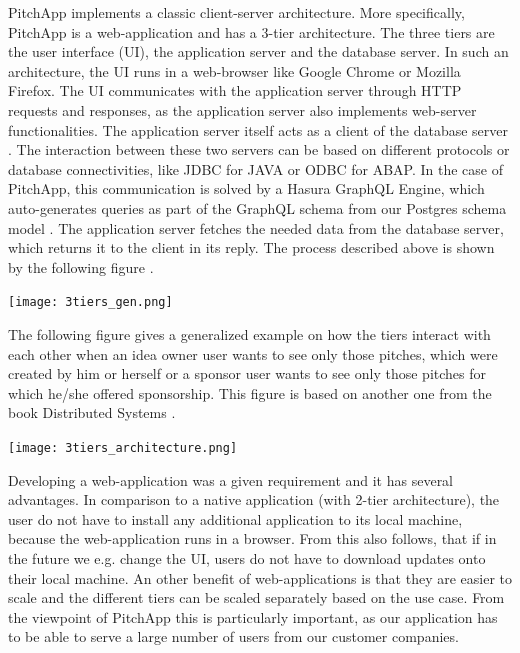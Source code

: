 PitchApp implements a classic client-server architecture. More specifically, PitchApp is a web-application and has a 3-tier architecture. The three tiers are the user interface (UI), the application server and the database server. In such an architecture, the UI runs in a web-browser like Google Chrome or Mozilla Firefox. The UI communicates with the application server through HTTP requests and responses, as the application server also implements web-server functionalities. The application server itself acts as a client of the database server \parencite[p.~80]{MT17}. The interaction between these two servers can be based on different protocols or database connectivities, like JDBC for JAVA or ODBC for ABAP. In the case of PitchApp, this communication is solved by a Hasura GraphQL Engine, which auto-generates queries as part of the GraphQL schema from our Postgres schema model \parencite{Hasura}. The application server fetches the needed data from the database server, which returns it to the client in its reply. The process described above is shown by the following figure \parencite[p.~80]{MT17}.

\begin{center}
\texttt{[image: 3tiers\_gen.png]}
\end{center}

\break

The following figure gives a generalized example on how the tiers interact with each other when an idea owner user wants to see only those pitches, which were created by him or herself or a sponsor user wants to see only those pitches for which he/she offered sponsorship. This figure is based on another one from the book Distributed Systems \parencite[p.~61]{MT17}.

\begin{center}
	\texttt{[image: 3tiers\_architecture.png]}
\end{center}

Developing a web-application was a given requirement and it has several advantages. In comparison to a native application (with 2-tier architecture), the user do not have to install any additional application to its local machine, because the web-application runs in a browser. From this also follows, that if in the future we e.g. change the UI, users do not have to download updates onto their local machine. An other benefit of web-applications is that they are easier to scale and the different tiers can be scaled separately based on the use case. From the viewpoint of PitchApp this is particularly important, as our application has to be able to serve a large number of users from our customer companies.

